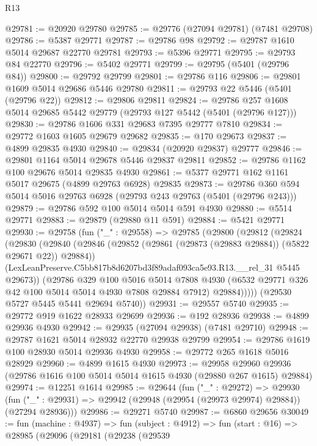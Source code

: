 \begin{lexlean}{R13}
\begin{coremodule}
@29781 := @20920 @29780
@29785 := @29776 (@27094 @29781) (@7481 @29708)
@29786 := @5387 @29771
@29787 := @29786 @98
@29792 := @29787 @1610 @5014 @29687 @22770 @29781
@29793 := @5396 @29771
@29795 := @29793 @84 @22770
@29796 := @5402 @29771
@29799 := @29795 (@5401 (@29796 @84))
@29800 := @29792 @29799
@29801 := @29786 @116
@29806 := @29801 @1609 @5014 @29686 @5446 @29780
@29811 := @29793 @22 @5446 (@5401 (@29796 @22))
@29812 := @29806 @29811
@29824 := @29786 @257 @1608 @5014 @29685 @5442 @29779 (@29793 @127 @5442 (@5401 (@29796 @127)))
@29830 := @29786 @1606 @331 @29683 @7395 @29777 @7810
@29834 := @29772 @1603 @1605 @29679 @29682
@29835 := @170 @29673
@29837 := @4899 @29835 @4930
@29840 := @29834 (@20920 @29837) @29777
@29846 := @29801 @1164 @5014 @29678 @5446 @29837 @29811
@29852 := @29786 @1162 @100 @29676 @5014 @29835 @4930
@29861 := @5377 @29771 @162 @1161 @5017 @29675 (@4899 @29763 @6928) @29835
@29873 := @29786 @360 @594 @5014 @5016 @29763 @6928 (@29793 @243 @29763 (@5401 (@29796 @243)))
@29879 := @29786 @592 @100 @5014 @5014 @591 @4930
@29880 := @5514 @29771
@29883 := @29879 (@29880 @11 @591)
@29884 := @5421 @29771
@29930 := @29758
    (fun ("_" : @29558) =>
    @29785
      (@29800
        (@29812
          (@29824
            (@29830
              (@29840
                (@29846 (@29852 (@29861 (@29873 (@29883 @29884)) (@5822 @29671 @22)) @29884))
                (LexLeanPreserve.C5bb817b8d6207bd3f89adaf093ca5e93.R13.__rel_31 @5445 @29673))
              (@29786
                @329
                @100
                @5016
                @5014
                @7808
                @4930
                (@6532 @29771 @326 @42 @100 @5014 @5014 @4930 @7808 @29884 @7912)
                @29884)))))
      (@29530 @5727 @5445 @5441 @29694 @5740))
@29931 := @29557 @5740
@29935 := @29772 @919 @1622 @28933 @29699
@29936 := @192 @28936
@29938 := @4899 @29936 @4930
@29942 := @29935 (@27094 @29938) (@7481 @29710)
@29948 := @29787 @1621 @5014 @28932 @22770 @29938 @29799
@29954 := @29786 @1619 @100 @28930 @5014 @29936 @4930
@29958 := @29772 @265 @1618 @5016 @28929
@29960 := @4899 @1615 @4930
@29973 := @29958
    @29960
    @29936
    (@29786 @1616 @100 @5014 @5014 @1615 @4930 (@29880 @267 @1615) @29884)
@29974 := @12251 @1614
@29985 := @29644
    (fun ("_" : @29272) =>
    @29930 (fun ("_" : @29931) => @29942 (@29948 (@29954 (@29973 @29974) @29884)) (@27294 @28936)))
@29986 := @29271 @5740
@29987 := @6860 @29656
@30049 := fun (machine : @4937) =>
  fun (subject : @4912) =>
  fun (start : @16) =>
  @28985
    (@29096
      (@29181
        (@29238
          (@29539

\end{coremodule}
\end{lexlean}
